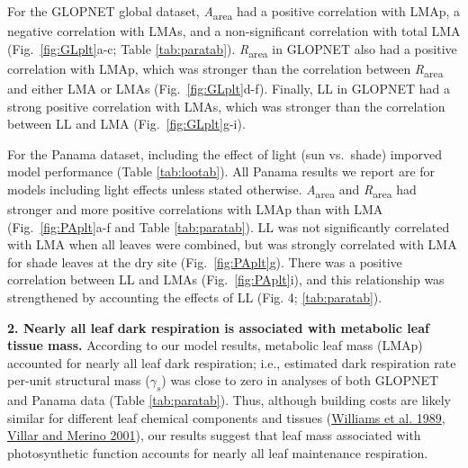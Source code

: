 \documentclass[
  12pt,
]{article}
\begin{document}
For the GLOPNET global dataset, \emph{A}\textsubscript{area} had a positive correlation with LMAp, a negative correlation with LMAs, and a non-significant correlation with total LMA (Fig.~\ref{fig:GLplt}a-c; Table \ref{tab:paratab}).
\emph{R}\textsubscript{area} in GLOPNET also had a positive correlation with LMAp, which was stronger than the correlation between \emph{R}\textsubscript{area} and either LMA or LMAs (Fig.~\ref{fig:GLplt}d-f).
Finally, LL in GLOPNET had a strong positive correlation with LMAs, which was stronger than the correlation between LL and LMA (Fig.~\ref{fig:GLplt}g-i).

For the Panama dataset, including the effect of light (sun vs.~shade) imporved model performance (Table \ref{tab:lootab}).
All Panama results we report are for models including light effects unless stated otherwise.
\emph{A}\textsubscript{area} and \emph{R}\textsubscript{area} had stronger and more positive correlations with LMAp than with LMA (Fig.~\ref{fig:PAplt}a-f and Table \ref{tab:paratab}).
LL was not significantly correlated with LMA when all leaves were combined, but was strongly correlated with LMA for shade leaves at the dry site (Fig.~\ref{fig:PAplt}g).
There was a positive correlation between LL and LMAs (Fig.~\ref{fig:PAplt}i), and this relationship was strengthened by accounting the effects of LL (Fig. 4; \ref{tab:paratab}).

\textbf{2. Nearly all leaf dark respiration is associated with metabolic leaf tissue mass.}
According to our model results, metabolic leaf mass (LMAp) accounted for nearly all leaf dark respiration; i.e., estimated dark respiration rate per-unit structural mass (\(\gamma_s\)) was close to zero in analyses of both GLOPNET and Panama data (Table \ref{tab:paratab}).
Thus, although building costs are likely similar for different leaf chemical components and tissues (\protect\hyperlink{ref-Williams1989}{Williams et al. 1989}, \protect\hyperlink{ref-Villar2001}{Villar and Merino 2001}), our results suggest that leaf mass associated with photosynthetic function accounts for nearly all leaf maintenance respiration.
\end{document}
